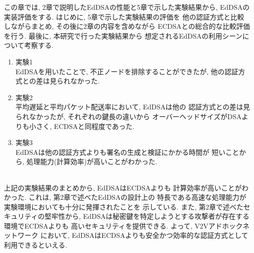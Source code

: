 この章では, 2章で説明したEdDSAの性能と5章で示した実験結果から, 
EdDSAの実装評価をする. はじめに, 5章で示した実験結果の評価を
他の認証方式と比較しながらまとめ, その後に2章の内容を含めながら
ECDSAとの総合的な比較評価を行う. 最後に, 本研究で行った実験結果から
想定されるEdDSAの利用シーンについて考察する.\\[1em]
\begin{enumerate}
  \item 実験1\\
  \indent EdDSAを用いたことで, 不正ノードを排除することができたが, 
  他の認証方式との差は見られなかった. 
  \item 実験2\\
  \indent 平均遅延と平均パケット配送率において, EdDSAは他の
  認証方式との差は見られなかったが, それぞれの鍵長の違いから
  オーバーヘッドサイズがDSAよりも小さく, ECDSAと同程度であった.
  \item 実験3\\
  \indent EdDSAは他の認証方式よりも署名の生成と検証にかかる時間が
  短いことから, 処理能力(計算効率)が高いことがわかった.
\end{enumerate}

\\
\indent 上記の実験結果のまとめから, EdDSAはECDSAよりも
計算効率が高いことがわかった. これは, 第2章で述べたEdDSAの設計上の
特長である高速な処理能力が実験環境においても十分に発揮されたことを
示している. また, 第2章で述べたセキュリティの堅牢性から, 
EdDSAは秘密鍵を特定しようとする攻撃者が存在する環境でECDSAよりも
高いセキュリティを提供できる. よって, V2Vアドホックネットワーク
において, EdDSAはECDSAよりも安全かつ効率的な認証方式として
利用できるといえる.\\

